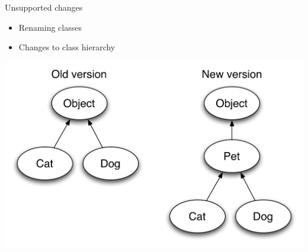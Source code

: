 \begin{frame}{Unsupported changes}%
\begin{itemize}
\item Renaming classes
\item Changes to class hierarchy
\end{itemize}
\begin{center}
\includegraphics[scale=0.5]{images/unsupported-changes}%
\end{center}
\end{frame}


% 

